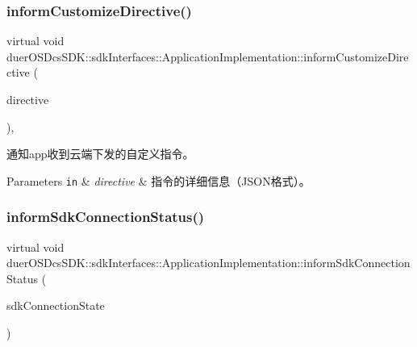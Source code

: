 \subsubsection{\texorpdfstring{inform\+Customize\+Directive()}{informCustomizeDirective()}}
{\footnotesize\ttfamily virtual void duer\+O\+S\+Dcs\+S\+D\+K\+::sdk\+Interfaces\+::\+Application\+Implementation\+::inform\+Customize\+Directive (\begin{DoxyParamCaption}\item[{const std\+::string \&}]{directive }\end{DoxyParamCaption})\hspace{0.3cm}{\ttfamily [inline]}, {\ttfamily [virtual]}}



通知app收到云端下发的自定义指令。 


\begin{DoxyParams}[1]{Parameters}
\mbox{\tt in}  & {\em directive} & 指令的详细信息（\+J\+S\+O\+N格式）。 \\
\hline
\end{DoxyParams}
\mbox{\label{classduerOSDcsSDK_1_1sdkInterfaces_1_1ApplicationImplementation_ac839c88ccbafd6fba8e5899bd2f2dd55}} 
\subsubsection{\texorpdfstring{inform\+Sdk\+Connection\+Status()}{informSdkConnectionStatus()}}
{\footnotesize\ttfamily virtual void duer\+O\+S\+Dcs\+S\+D\+K\+::sdk\+Interfaces\+::\+Application\+Implementation\+::inform\+Sdk\+Connection\+Status (\begin{DoxyParamCaption}\item[{Sdk\+Connection\+State}]{sdk\+Connection\+State }\end{DoxyParamCaption})\hspace{0.3cm}{\ttfamily [pure virtual]}}



